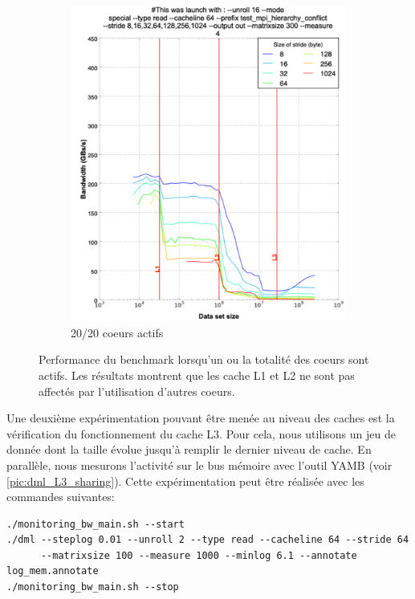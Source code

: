 \begin{figure}
\begin{subfigure}[b]{0.47\linewidth}
            \includegraphics[width=\linewidth]{images/dml_cache_20core.png}
            \caption{20/20 coeurs actifs}
            \label{pic:dml_cache_20core}
            \end{subfigure}
        \caption{Performance du benchmark lorsqu'un ou la totalité des coeurs sont actifs. Les résultats montrent que les cache L1 et L2 ne sont pas affectés par l'utilisation d'autres coeurs.}\label{pic:dml_cache}
        \end{figure}
        
        Une deuxième expérimentation pouvant être menée au niveau des caches est la vérification du fonctionnement du cache L3. Pour cela, nous utilisons un jeu de donnée dont la taille évolue jusqu'à remplir le dernier niveau de cache.  En parallèle, nous mesurons l'activité sur le bus mémoire avec l'outil YAMB (voir \autoref{pic:dml_L3_sharing}). Cette expérimentation peut être réalisée avec les commandes suivantes:
        \begin{verbatim}
./monitoring_bw_main.sh --start
./dml --steplog 0.01 --unroll 2 --type read --cacheline 64 --stride 64  
      --matrixsize 100 --measure 1000 --minlog 6.1 --annotate log_mem.annotate
./monitoring_bw_main.sh --stop
        \end{verbatim}
        
